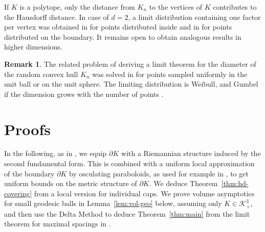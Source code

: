 \documentclass[a4paper,12pt,reqno]{amsart}
\theoremstyle{definition}
\newtheorem{remark}{Remark}
\newcommand{\cK}{\mathcal{K}}
\begin{document}
If $K$ is a polytope, only the distance from $K_n$ to the vertices of $K$ contributes to the Hausdorff distance. In case of $d=2$, a limit distribution containing one factor per vertex was obtained in \cite{BHB98} for points distributed inside and in \cite{PSS+24} for points distributed on the boundary.  It remains open to obtain analogous results in higher dimensions.

\begin{remark}
The related problem of deriving a limit theorem for the diameter of the random convex hull $K_n$ was solved in \cite{MM07} for points sampled uniformly in the unit ball or on the unit sphere. The limiting distribution is Weibull, and Gumbel if the dimension grows with the number of points \cite{HK25}. 
\end{remark}

\section{Proofs}


In the following, as in \cite{GS96,Gru93}, we equip $\partial K$ with a Riemannian structure induced by the second fundamental form. This is combined with a uniform local approximation of the boundary $\partial K$ by osculating paraboloids, as used for example in \cite{Rei05}, to get uniform bounds on the metric structure of $\partial K$. We deduce Theorem~\ref{thm:hd-covering} from a local version for individual caps. We prove volume asymptotics for small geodesic balls in Lemma~\ref{lem:vol-geo} below, assuming only $K\in \cK^3_+$, and then use the Delta Method to deduce Theorem~\ref{thm:main} from the limit theorem for maximal spacings in \cite{Jan87}. 
\end{document}
